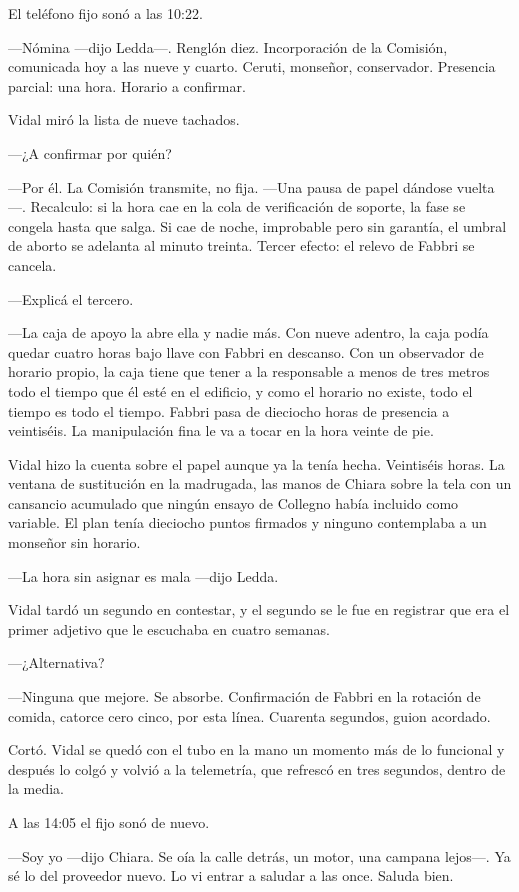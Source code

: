 El teléfono fijo sonó a las 10:22.

---Nómina ---dijo Ledda---. Renglón diez. Incorporación de la Comisión, comunicada hoy a las nueve y cuarto. Ceruti, monseñor, conservador. Presencia parcial: una hora. Horario a confirmar.

Vidal miró la lista de nueve tachados.

---¿A confirmar por quién?

---Por él. La Comisión transmite, no fija. ---Una pausa de papel dándose vuelta---. Recalculo: si la hora cae en la cola de verificación de soporte, la fase se congela hasta que salga. Si cae de noche, improbable pero sin garantía, el umbral de aborto se adelanta al minuto treinta. Tercer efecto: el relevo de Fabbri se cancela.

---Explicá el tercero.

---La caja de apoyo la abre ella y nadie más. Con nueve adentro, la caja podía quedar cuatro horas bajo llave con Fabbri en descanso. Con un observador de horario propio, la caja tiene que tener a la responsable a menos de tres metros todo el tiempo que él esté en el edificio, y como el horario no existe, todo el tiempo es todo el tiempo. Fabbri pasa de dieciocho horas de presencia a veintiséis. La manipulación fina le va a tocar en la hora veinte de pie.

Vidal hizo la cuenta sobre el papel aunque ya la tenía hecha. Veintiséis horas. La ventana de sustitución en la madrugada, las manos de Chiara sobre la tela con un cansancio acumulado que ningún ensayo de Collegno había incluido como variable. El plan tenía dieciocho puntos firmados y ninguno contemplaba a un monseñor sin horario.

---La hora sin asignar es mala ---dijo Ledda.

Vidal tardó un segundo en contestar, y el segundo se le fue en registrar que era el primer adjetivo que le escuchaba en cuatro semanas.

---¿Alternativa?

---Ninguna que mejore. Se absorbe. Confirmación de Fabbri en la rotación de comida, catorce cero cinco, por esta línea. Cuarenta segundos, guion acordado.

Cortó. Vidal se quedó con el tubo en la mano un momento más de lo funcional y después lo colgó y volvió a la telemetría, que refrescó en tres segundos, dentro de la media.

A las 14:05 el fijo sonó de nuevo.

---Soy yo ---dijo Chiara. Se oía la calle detrás, un motor, una campana lejos---. Ya sé lo del proveedor nuevo. Lo vi entrar a saludar a las once. Saluda bien.

